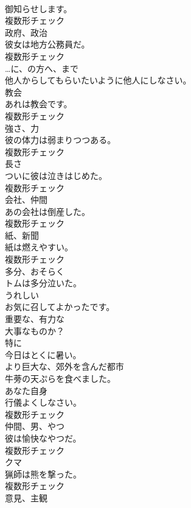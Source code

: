 \documentclass[8pt]{extreport}
\begin{document}
\begin{CJK}{UTF8}{min}
\\	御知らせします。	
\\	複数形チェック
\\	[名詞]	政府、政治	
\\	彼女は地方公務員だ。	
\\	複数形チェック
\\	[前置詞]	…に、の方へ、まで	
\\	他人からしてもらいたいように他人にしなさい。	
\\	[名詞]	教会	
\\	あれは教会です。	
\\	複数形チェック
\\	[名詞]	強さ、力	
\\	彼の体力は弱まりつつある。	
\\	複数形チェック
\\	[名詞]	長さ	
\\	ついに彼は泣きはじめた。	
\\	複数形チェック
\\	[名詞]	会社、仲間	
\\	あの会社は倒産した。	
\\	複数形チェック
\\	[名詞]	紙、新聞	
\\	紙は燃えやすい。	
\\	複数形チェック
\\	[副詞]	多分、おそらく	
\\	トムは多分泣いた。	
\\	[形容詞]	うれしい	
\\	お気に召してよかったです。	
\\	[形容詞]	重要な、有力な	
\\	大事なものか？	
\\	[副詞]	特に	
\\	今日はとくに暑い。	
\\	[形容詞]	より巨大な、郊外を含んだ都市	
\\	牛蒡の天ぷらを食べました。	
\\	[代名詞]	あなた自身	
\\	行儀よくしなさい。	
\\	複数形チェック
\\	[名詞]	仲間、男、やつ	
\\	彼は愉快なやつだ。	
\\	複数形チェック
\\	[名詞]	クマ	
\\	猟師は熊を撃った。	
\\	複数形チェック
\\	[名詞]	意見、主観	

\end{CJK}
\end{document}

